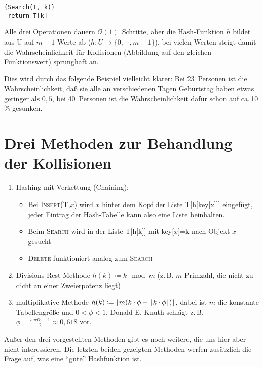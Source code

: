 \documentclass[ngerman,draft,parskip=half*,twoside]{scrreprt}
\theoremstyle{break}
\theoremstyle{nonumberbreak}
\newcommand*{\OO}{\mathcal{O}}      %
\DeclarePairedDelimiter{\floor}{\lfloor}{\rfloor}
\begin{document}
\begin{Algorithmus}[H]
\begin{lstlisting}[frame=tlrb, mathescape=true, title=\textsc{Search\textnormal{(T, k)}},gobble=1]{Search(T, k)}
 return T[k]
\end{lstlisting}
\end{Algorithmus} 

Alle drei Operationen dauern $\OO(1)$~Schritte, aber
die Hash-Funktion $h$ bildet aus U auf $m-1$ Werte ab ($h\colon U \rightarrow \{0, \cdots, m-1\}$), bei vielen Werten steigt
damit die Wahrscheinlichkeit für Kollisionen (Abbildung auf den gleichen Funktionswert) sprunghaft an. 

Dies wird durch das folgende Beispiel vielleicht klarer: Bei
23~Personen ist die Wahrscheinlichkeit, daß sie alle an verschiedenen
Tagen Geburtstag haben etwas geringer als $0,5$, bei 40~Personen ist
die Wahrscheinlichkeit dafür schon auf ca.\,10\,\% gesunken.

\section{Drei Methoden zur Behandlung der Kollisionen}
\begin{enumerate}
\item Hashing mit Verkettung (Chaining): 
  \begin{itemize}
  \item Bei \textsc{Insert}(T,$x$) wird $x$ hinter dem Kopf der Liste T[h[key[x]]]
    eingefügt, jeder Eintrag der Hash-Tabelle kann also eine Liste beinhalten. 
  \item Beim \textsc{Search} wird in der Liste T[h[k]] mit key[$x$]=k nach Objekt $x$ gesucht
  \item \textsc{Delete} funktioniert analog zum \textsc{Search}
  \end{itemize}
\item Divisions-Rest-Methode $h(k)\coloneqq k \mod m$ (z.\,B. $m$ Primzahl, die nicht zu dicht an einer Zweierpotenz liegt)  
\item multiplikative Methode $h(k)\coloneqq \floor{ m(k \cdot \phi -\floor{ k \cdot \phi }) }$, dabei ist $m$ die
konstante Tabellengröße und $0 < \phi <1$. Donald E. Knuth schlägt z.\,B. $\phi=\frac{sqrt{5}-1}{2} \approx 0,618$ vor.
\end{enumerate} 
Außer den drei vorgestellten Methoden gibt es noch weitere, die uns hier aber nicht interessieren. Die letzten beiden gezeigten Methoden werfen zusätzlich die Frage auf, was eine
"`gute"' Hashfunktion ist.
\end{document}
